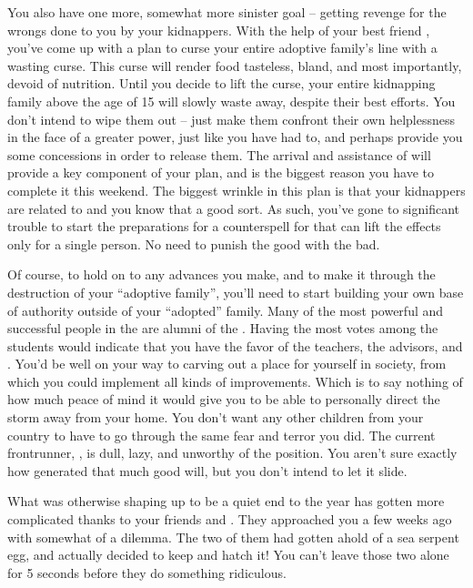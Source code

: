 \documentclass[char]{GL2020}
\begin{document}
You also have one more, somewhat more sinister goal -- getting revenge for the wrongs done to you by your kidnappers.  With the help of your best friend \cLibAssist{}, you’ve come up with a plan to curse your entire adoptive family’s line with a wasting curse. This curse will render food tasteless, bland, and most importantly, devoid of nutrition. Until you decide to lift the curse, your entire kidnapping family above the age of 15 will slowly waste away, despite their best efforts. You don’t intend to wipe them out -- just make them confront their own helplessness in the face of a greater power, just like you have had to, and perhaps provide you some concessions in order to release them. The arrival and assistance of \cCurse{} will provide a key component of your plan, and is the biggest reason you have to complete it this weekend.  The biggest wrinkle in this plan is that your kidnappers are related to \cMusic{} and you know that  a good sort. As such, you’ve gone to significant trouble to start the preparations for a counterspell for \cMusic{\them} that can lift the effects only for a single person. No need to punish the good with the bad.

Of course, to hold on to any advances you make, and to make it through the destruction of your ``adoptive family'', you'll need to start building your own base of authority outside of your ``adopted'' family. Many of the most powerful and successful people in the \pFarm{} are alumni of the \pSchool{}. Having the most votes among the \pFarmers{} students would indicate that you have the favor of the teachers, the advisors, and \cFarmGod{}. You'd be well on your way to carving out a place for yourself in \pFarm{} society, from which you could implement all kinds of improvements. Which is to say nothing of how much peace of mind it would give you to be able to personally direct the storm away from your home. You don't want any other children from your country to have to go through the same fear and terror you did. The current frontrunner, \cChupStudent{}, is dull, lazy, and unworthy of the position. You aren’t sure exactly how \cChupStudent{\they} generated that much good will, but you don’t intend to let it slide.

What was otherwise shaping up to be a quiet end to the year has gotten more complicated thanks to your friends \cDisney{} and \cPirateChild{}. They approached you a few weeks ago with somewhat of a dilemma. The two of them had gotten ahold of a sea serpent egg, and actually decided to keep and hatch it! You can't leave those two alone for 5 seconds before they do something ridiculous. 
\end{document}
